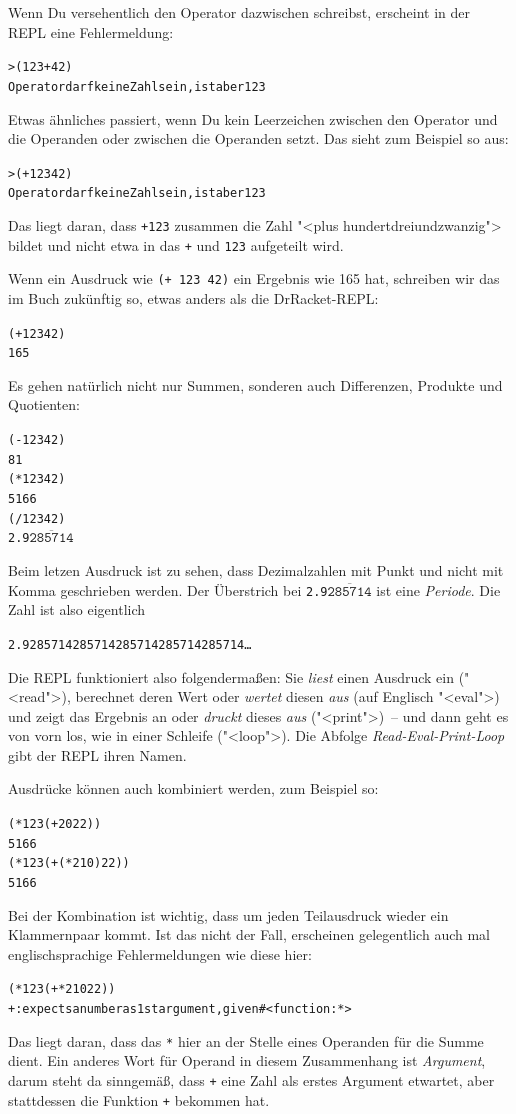 Wenn Du versehentlich den Operator dazwischen schreibst, erscheint
in der REPL eine Fehlermeldung:
%
\begin{alltt}
> ({\color{green}123} + {\color{green}42})
{\color{red}Operator darf keine Zahl sein, ist aber 123}
\end{alltt}
%
Etwas ähnliches passiert, wenn Du kein Leerzeichen zwischen den
Operator und die Operanden oder zwischen die Operanden setzt.  Das
sieht zum Beispiel so aus:
%
\begin{alltt}
> ({\color{green}+123} {\color{green}42})
{\color{red}Operator darf keine Zahl sein, ist aber 123}
\end{alltt}
%
Das liegt daran, dass \texttt{+123} zusammen die Zahl "<plus
hundertdreiundzwanzig"> bildet und nicht etwa in das \texttt{+} und
\texttt{123} aufgeteilt wird.

Wenn ein Ausdruck wie \texttt{(+ 123 42)} ein Ergebnis wie 165 hat,
schreiben wir das im Buch zukünftig so, etwas anders als die
DrRacket-REPL:
%
\begin{alltt}
(+ 123 42)
\evalsto{} 165
\end{alltt}
%
Es gehen natürlich nicht nur Summen, sonderen auch Differenzen,
Produkte und Quotienten:
%
\begin{alltt}
(- 123 42)
\evalsto{} 81
(* 123 42)
\evalsto{} 5166
(/ 123 42)
\evalsto{} 2.9\(\overline{\mathtt{285714}}\)
\end{alltt}
%
Beim letzen Ausdruck ist zu sehen, dass Dezimalzahlen mit Punkt und
nicht mit Komma geschrieben werden.  Der Überstrich bei
\texttt{2.9\(\overline{\mathtt{285714}}\)} ist eine
\textit{Periode}. Die Zahl ist also eigentlich
%
\begin{alltt}
2.9285714285714285714285714285714\ldots
\end{alltt}
%
Die REPL funktioniert also folgendermaßen: Sie \emph{liest} einen
Ausdruck ein ("<read">), berechnet deren Wert oder \emph{wertet}
diesen \emph{aus} (auf Englisch "<eval">) und zeigt das Ergebnis an
oder \emph{druckt} dieses \emph{aus} ("<print">)~-- und dann geht es
von vorn los, wie in einer Schleife ("<loop">).  Die Abfolge
\emph{Read-Eval-Print-Loop} gibt der REPL ihren Namen.

Ausdrücke können auch kombiniert werden, zum Beispiel so:
%
\begin{alltt}
(* 123 (+ 20 22))
\evalsto{} 5166
(* 123 (+ (* 2 10) 22))
\evalsto{} 5166
\end{alltt}
%
Bei der Kombination ist wichtig, dass um jeden Teilausdruck wieder ein
Klammernpaar kommt.  Ist das nicht der Fall, erscheinen gelegentlich
auch mal englischsprachige Fehlermeldungen wie diese hier:
%
\begin{alltt}
(* 123 (+ * 2 10 22))
{\color{red}+: expects a number as 1st argument, given #<function:*>}
\end{alltt}
%
Das liegt daran, dass das \texttt{*} hier an der Stelle eines
Operanden für die Summe dient.  Ein anderes Wort für Operand in diesem
Zusammenhang ist \textit{Argument}, darum steht da sinngemäß, dass
\texttt{+} eine Zahl als erstes Argument etwartet, aber
stattdessen die Funktion \texttt{+} bekommen hat.

